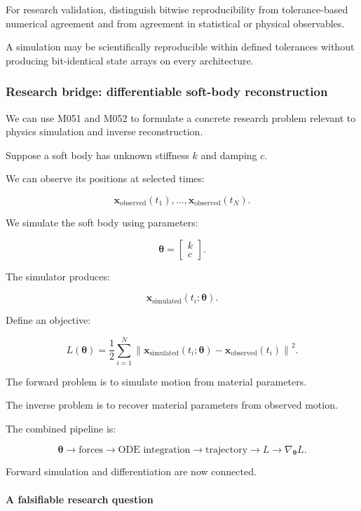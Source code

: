 For research validation, distinguish bitwise reproducibility from tolerance-based numerical agreement and from agreement in statistical or physical observables.

A simulation may be scientifically reproducible within defined tolerances without producing bit-identical state arrays on every architecture.

\subsubsection{Research bridge: differentiable soft-body reconstruction}\label{research-bridge-differentiable-soft-body-reconstruction}

We can use M051 and M052 to formulate a concrete research problem relevant to physics simulation and inverse reconstruction.

Suppose a soft body has unknown stiffness \(k\) and damping \(c\).

We can observe its positions at selected times:

\[
\mathbf x_{\mathrm{observed}}(t_1),\ldots, \mathbf x_{\mathrm{observed}}(t_N).
\]

We simulate the soft body using parameters:

\[
\boldsymbol\theta= \begin{bmatrix} k\\c \end{bmatrix}.
\]

The simulator produces:

\[
\mathbf x_{\mathrm{simulated}}(t_i;\boldsymbol\theta).
\]

Define an objective:

\[
\boxed{ L(\boldsymbol\theta)= \frac12\sum_{i=1}^{N} \left\| \mathbf x_{\mathrm{simulated}}(t_i;\boldsymbol\theta) - \mathbf x_{\mathrm{observed}}(t_i) \right\|^2 }.
\]

The forward problem is to simulate motion from material parameters.

The inverse problem is to recover material parameters from observed motion.

The combined pipeline is:

\[
\boldsymbol\theta \rightarrow \text{forces} \rightarrow \text{ODE integration} \rightarrow \text{trajectory} \rightarrow L \rightarrow \nabla_{\boldsymbol\theta}L.
\]

Forward simulation and differentiation are now connected.

\paragraph{A falsifiable research question}\label{a-falsifiable-research-question}

